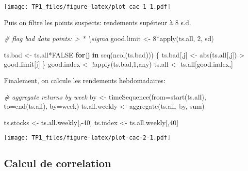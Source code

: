 \documentclass[
]{article}
\newenvironment{Shaded}{\begin{snugshade}}{\end{snugshade}}
\newcommand{\AttributeTok}[1]{\textcolor[rgb]{0.77,0.63,0.00}{#1}}
\newcommand{\CommentTok}[1]{\textcolor[rgb]{0.56,0.35,0.01}{\textit{#1}}}
\newcommand{\ConstantTok}[1]{\textcolor[rgb]{0.00,0.00,0.00}{#1}}
\newcommand{\ControlFlowTok}[1]{\textcolor[rgb]{0.13,0.29,0.53}{\textbf{#1}}}
\newcommand{\DecValTok}[1]{\textcolor[rgb]{0.00,0.00,0.81}{#1}}
\newcommand{\FunctionTok}[1]{\textcolor[rgb]{0.00,0.00,0.00}{#1}}
\newcommand{\NormalTok}[1]{#1}
\newcommand{\OtherTok}[1]{\textcolor[rgb]{0.56,0.35,0.01}{#1}}
\newcommand{\SpecialCharTok}[1]{\textcolor[rgb]{0.00,0.00,0.00}{#1}}
\newcommand{\StringTok}[1]{\textcolor[rgb]{0.31,0.60,0.02}{#1}}
\begin{document}
\texttt{[image: TP1\_files/figure-latex/plot-cac-1-1.pdf]}

Puis on filtre les points suspects: rendements supérieur à 8 s.d.

\begin{Shaded}
\begin{Highlighting}[]
  \CommentTok{\# flag bad data points: \textgreater{} * \textbackslash{}sigma}
\NormalTok{  good.limit }\OtherTok{\textless{}{-}} \DecValTok{8}\SpecialCharTok{*}\FunctionTok{apply}\NormalTok{(ts.all, }\DecValTok{2}\NormalTok{, sd)}
  
\NormalTok{  ts.bad }\OtherTok{\textless{}{-}}\NormalTok{ ts.all}\SpecialCharTok{*}\ConstantTok{FALSE}
  \ControlFlowTok{for}\NormalTok{(j }\ControlFlowTok{in} \FunctionTok{seq}\NormalTok{(}\FunctionTok{ncol}\NormalTok{(ts.bad))) \{}
\NormalTok{    ts.bad[,j] }\OtherTok{\textless{}{-}} \FunctionTok{abs}\NormalTok{(ts.all[,j]) }\SpecialCharTok{\textgreater{}}\NormalTok{ good.limit[j]}
\NormalTok{  \}}
\NormalTok{  good.index }\OtherTok{\textless{}{-}} \SpecialCharTok{!}\FunctionTok{apply}\NormalTok{(ts.bad,}\DecValTok{1}\NormalTok{,any)}
\NormalTok{  ts.all }\OtherTok{\textless{}{-}}\NormalTok{ ts.all[good.index,]}
\end{Highlighting}
\end{Shaded}

Finalement, on calcule les rendements hebdomadaires:

\begin{Shaded}
\begin{Highlighting}[]
  \CommentTok{\# aggregate returns by week}
\NormalTok{  by }\OtherTok{\textless{}{-}} \FunctionTok{timeSequence}\NormalTok{(}\AttributeTok{from=}\FunctionTok{start}\NormalTok{(ts.all), }
                     \AttributeTok{to=}\FunctionTok{end}\NormalTok{(ts.all), }\AttributeTok{by=}\StringTok{\textquotesingle{}week\textquotesingle{}}\NormalTok{)}
\NormalTok{  ts.all.weekly }\OtherTok{\textless{}{-}} \FunctionTok{aggregate}\NormalTok{(ts.all, by, sum)}

\NormalTok{  ts.stocks }\OtherTok{\textless{}{-}}\NormalTok{ ts.all.weekly[,}\SpecialCharTok{{-}}\DecValTok{40}\NormalTok{]}
\NormalTok{  ts.index }\OtherTok{\textless{}{-}}\NormalTok{ ts.all.weekly[,}\DecValTok{40}\NormalTok{]}
\end{Highlighting}
\end{Shaded}

\texttt{[image: TP1\_files/figure-latex/plot-cac-2-1.pdf]}

\hypertarget{calcul-de-correlation}{%
\subsection{Calcul de correlation}\label{calcul-de-correlation}}
\end{document}
